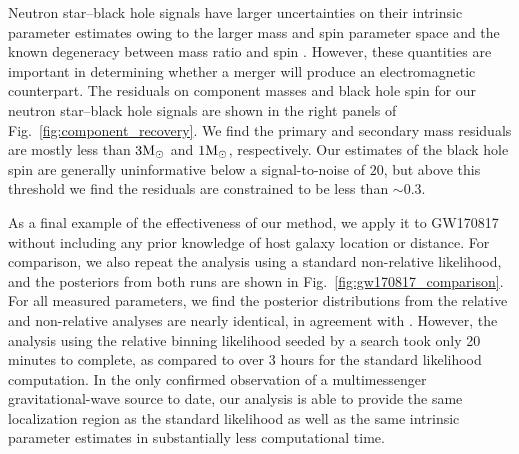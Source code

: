Neutron star--black hole signals have larger uncertainties on their intrinsic parameter estimates owing to the larger mass and spin parameter space and the known degeneracy between mass ratio and spin \cite{Hannam_2013}. However, these quantities are important in determining whether a merger will produce an electromagnetic counterpart. The residuals on component masses and black hole spin for our neutron star--black hole signals are shown in the right panels of Fig.~\ref{fig:component_recovery}. We find the primary and secondary mass residuals are mostly less than $3\mathrm{M}_{\odot}$ and $1\mathrm{M}_{\odot}$, respectively. Our estimates of the black hole spin are generally uninformative below a signal-to-noise of $20$, but above this threshold we find the residuals are constrained to be less than $\sim 0.3$.

As a final example of the effectiveness of our method, we apply it to GW170817 \cite{TheLIGOScientific:2017qsa} without including any prior knowledge of host galaxy location or distance. For comparison, we also repeat the analysis using a standard non-relative likelihood, and the posteriors from both runs are shown in Fig.~\ref{fig:gw170817_comparison}. For all measured parameters, we find the posterior distributions from the relative and non-relative analyses are nearly identical, in agreement with \cite{Dai:2018dca}. However, the analysis using the relative binning likelihood seeded by a search took only 20 minutes to complete, as compared to over 3 hours for the standard likelihood computation. In the only confirmed observation of a multimessenger gravitational-wave source to date, our analysis is able to provide the same localization region as the standard likelihood as well as the same intrinsic parameter estimates in substantially less computational time.

